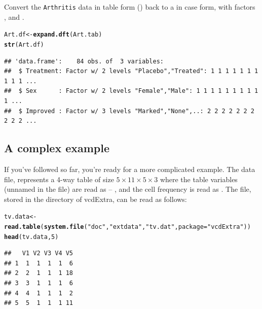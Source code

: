 \documentclass[10pt,twoside]{article}\usepackage[]{graphicx}\usepackage[]{color}
\makeatletter
\newcommand{\hlnum}[1]{\textcolor[rgb]{0.686,0.059,0.569}{#1}}%
\newcommand{\hlstr}[1]{\textcolor[rgb]{0.192,0.494,0.8}{#1}}%
\newcommand{\hlstd}[1]{\textcolor[rgb]{0.345,0.345,0.345}{#1}}%
\newcommand{\hlkwb}[1]{\textcolor[rgb]{0.69,0.353,0.396}{#1}}%
\newcommand{\hlkwc}[1]{\textcolor[rgb]{0.333,0.667,0.333}{#1}}%
\newcommand{\hlkwd}[1]{\textcolor[rgb]{0.737,0.353,0.396}{\textbf{#1}}}%
\newenvironment{kframe}{%
 \def\at@end@of@kframe{}%
 \ifinner\ifhmode%
  \def\at@end@of@kframe{\end{minipage}}%
  \begin{minipage}{\columnwidth}%
 \fi\fi%
 \def\FrameCommand##1{\hskip\@totalleftmargin \hskip-\fboxsep
 \colorbox{shadecolor}{##1}\hskip-\fboxsep
     \hskip-\linewidth \hskip-\@totalleftmargin \hskip\columnwidth}%
 \MakeFramed {\advance\hsize-\width
   \@totalleftmargin\z@ \linewidth\hsize
   \@setminipage}}%
 {\par\unskip\endMakeFramed%
 \at@end@of@kframe}
\newenvironment{knitrout}{}{} %
\newcommand*{\Example}{\fbox{\textbf{\emph{Example}}:} }
\newcommand{\data}[1]{\texttt{#1}}
\newcommand{\pkg}[1]{{\normalfont\fontseries{b}\selectfont #1}}
\makeatother
\begin{document}
\Example Convert the \data{Arthritis} data in table form () back to a 
in case form, with factors
,  and .
\begin{knitrout}
\color{fgcolor}\begin{kframe}
\begin{alltt}
\hlstd{Art.df} \hlkwb{<-} \hlkwd{expand.dft}\hlstd{(Art.tab)}
\hlkwd{str}\hlstd{(Art.df)}
\end{alltt}
\begin{verbatim}
## 'data.frame':	84 obs. of  3 variables:
##  $ Treatment: Factor w/ 2 levels "Placebo","Treated": 1 1 1 1 1 1 1 1 1 1 ...
##  $ Sex      : Factor w/ 2 levels "Female","Male": 1 1 1 1 1 1 1 1 1 1 ...
##  $ Improved : Factor w/ 3 levels "Marked","None",..: 2 2 2 2 2 2 2 2 2 2 ...
\end{verbatim}
\end{kframe}
\end{knitrout}


\subsection{A complex example}\label{sec:complex}

If you've followed so far, you're ready for a more complicated example.
The data file,  represents a 4-way table of size
$5 \times 11 \times 5 \times 3$ where the table variables (unnamed in the file)
are read as  -- , and the cell frequency is read
as .  The file, stored in the  directory
of \pkg{vcdExtra}, can be read as follows:
\begin{knitrout}
\color{fgcolor}\begin{kframe}
\begin{alltt}
\hlstd{tv.data}\hlkwb{<-}\hlkwd{read.table}\hlstd{(}\hlkwd{system.file}\hlstd{(}\hlstr{"doc"}\hlstd{,}\hlstr{"extdata"}\hlstd{,}\hlstr{"tv.dat"}\hlstd{,}\hlkwc{package}\hlstd{=}\hlstr{"vcdExtra"}\hlstd{))}
\hlkwd{head}\hlstd{(tv.data,}\hlnum{5}\hlstd{)}
\end{alltt}
\begin{verbatim}
##   V1 V2 V3 V4 V5
## 1  1  1  1  1  6
## 2  2  1  1  1 18
## 3  3  1  1  1  6
## 4  4  1  1  1  2
## 5  5  1  1  1 11
\end{verbatim}
\end{kframe}
\end{knitrout}
\end{document}
